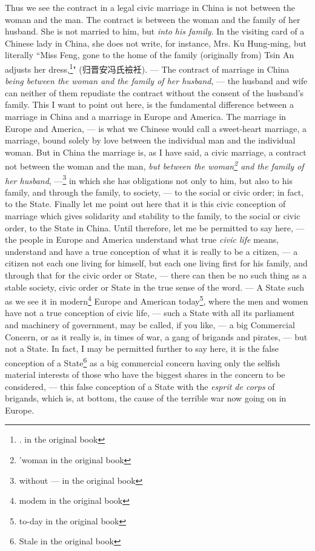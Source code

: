 Thus we see the contract in a legal civic marriage in China is not between the woman and the man.
The contract is between the woman and the family of her husband.
She is not married to him, but \emph{into his family}.
In the visiting card of a Chinese lady in China, she does not write, for instance, Mrs. Ku Hung-ming, but literally ``Miss Feng, gone to the home of the family (originally from) Tsin An adjusts her dress,\footnote{. in the original book}" (归晋安冯氏襝衽).
--- The contract of marriage in China \emph{being between the woman and the family of her husband}, --- the husband and wife can neither of them repudiate the contract without the consent of the husband's family.
This I want to point out here, is the fundamental difference between a marriage in China and a marriage in Europe and America.
The marriage in Europe and America, --- is what we Chinese would call a sweet-heart marriage, a marriage, bound solely by love between the individual man and the individual woman.
But in China the marriage is, as I have said, a civic marriage, a contract not between the woman and the man, \emph{but between the woman\footnote{'woman in the original book} and the family of her husband}, ---\footnote{without --- in the original book} in which she has obligations not only to him, but also to his family, and through the family, to society, --- to the social or civic order; in fact, to the State.
Finally let me point out here that it is this civic conception of marriage which gives solidarity and stability to the family, to the social or civic order, to the State in China. 
Until therefore, let me be permitted to say here, --- the people in Europe and America understand what true \emph{civic life} means, understand and have a true conception of what it is really to be a citizen, --- a citizen not each one living for himself, but each one living first for his family, and through that for the civic order or State, --- there can then be no such thing as a stable society, civic order or State in the true sense of the word.
--- A State such as we see it in modern\footnote{modem in the original book} Europe and American today\footnote{to-day in the original book}, where the men and women have not a true conception of civic life, --- such a State with all its parliament and machinery of government, may be called, if you like, --- a big Commercial Concern, or as it really is, in times of war, a gang of brigands and pirates, --- but not a State.
In fact, I may be permitted further to say here, it is the false conception of a State\footnote{Stale in the original book} as a big commercial concern having only the selfish material interests of those who have the biggest shares in the concern to be considered, --- this false conception of a State with the \emph{esprit de corps} of brigands, which is, at bottom, the cause of the terrible war now going on in Europe.
